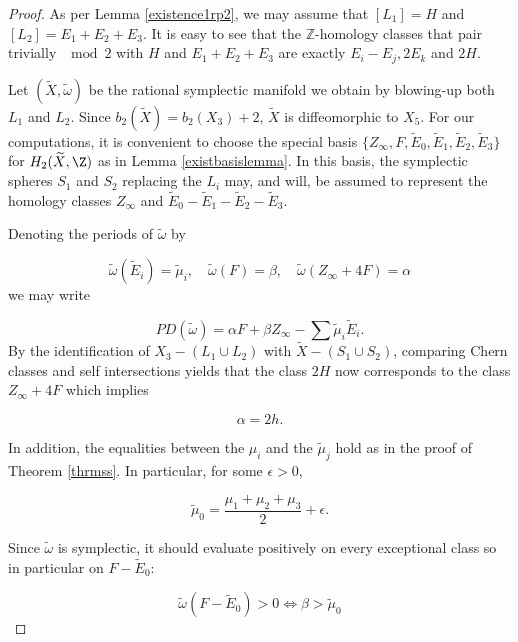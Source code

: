 \begin{proof}
As per Lemma \ref{existence1rp2}, we may assume that $[L_1]=H$ and $[L_2]=E_1+E_2+E_3$. It is easy to see that the $\mathbb{Z}$-homology classes that pair trivially $\mod 2$ with $H$ and $E_1+E_2+E_3$ are exactly $E_i-E_j,2E_k$ and $2H$.\par

Let $(\widetilde{X},\tilde{\omega})$ be the rational symplectic manifold we obtain by blowing-up both $L_1$ and $L_2$. Since $b_2(\widetilde{X})=b_2(X_3)+2$, $\widetilde{X}$ is diffeomorphic to $X_5$.  For our computations, it is convenient to choose the special basis $\{ Z_\infty,F, \widetilde{E}_0,\widetilde{E}_1,\widetilde{E}_2,\widetilde{E}_3 \}$ for $H_2(\widetilde{X},\Z )$ as in Lemma \ref{existbasislemma}. In this basis, the symplectic spheres $S_1$ and $S_2$ replacing the $L_i$ may, and will, be assumed to represent the homology classes $Z_\infty$ and $\widetilde{E}_0-\widetilde{E}_1-\widetilde{E}_2-\widetilde{E}_3$. \par 

Denoting the periods of $\widetilde{\omega}$ by

\[\tilde{\omega}(\widetilde{E}_i)=\tilde{\mu}_i,\quad \tilde{\omega}(F)=\beta,\quad  \tilde{\omega}(Z_\infty+4F)=\alpha\]
we may write

\[PD(\tilde{\omega})=\alpha F +\beta Z_\infty-\sum \tilde{\mu}_i\widetilde{E}_i. \]
By the identification of $X_3-(L_1\cup L_2)$ with $\widetilde{X}-(S_1\cup S_2)$, comparing Chern classes and self intersections yields that the class $2H$ now corresponds to the class $Z_\infty+4F$ which implies

\begin{equation}
    \alpha=2h.
\end{equation}

In addition, the equalities between the $\mu_i$ and the $\tilde{\mu}_j$ hold as in the proof of Theorem \ref{thrmss}. In particular, for some $\epsilon>0$,

\[\tilde{\mu}_0=\frac{\mu_1+\mu_2+\mu_3}{2}+\epsilon.\]



Since $\tilde{\omega}$ is symplectic, it should evaluate positively on every exceptional class so in particular on $F-\widetilde{E}_0$:

\begin{equation}
    \tilde{\omega}(F-\widetilde{E}_0)>0\Leftrightarrow \beta>\tilde{\mu}_0
\end{equation}


\end{proof}
